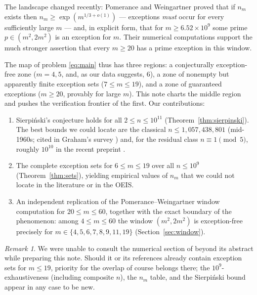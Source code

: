 \documentclass[11pt]{amsart}
\theoremstyle{remark}
\newtheorem{remark}[theorem]{Remark}
\theoremstyle{definition}
\begin{document}
The landscape changed recently: Pomerance and Weingartner
\cite{pomeranceweingartner2026} proved that if $n_m$ exists then
$n_m \ge \exp(m^{1/3+o(1)})$ --- exceptions \emph{must} occur for every
sufficiently large $m$ --- and, in explicit form, that for
$m \ge 6.52 \times 10^9$ some prime $p \in (m^2, 2m^2)$ is an exception
for $m$. Their numerical computations support the much stronger assertion
that every $m \ge 20$ has a prime exception in this window.

The map of problem \eqref{eq:main} thus has three regions: a
conjecturally exception-free zone ($m = 4, 5$, and, as our data suggests,
$6$), a zone of nonempty but apparently finite exception sets
($7 \le m \le 19$), and a zone of guaranteed exceptions ($m \ge 20$,
provably for large $m$). This note charts the middle region and pushes
the verification frontier of the first. Our contributions:

\begin{enumerate}
\item Sierpi\'nski's conjecture holds for all $2 \le n \le 10^{11}$
  (Theorem~\ref{thm:sierpinski}). The best bounds we could locate are the
  classical $n \le 1{,}057{,}438{,}801$ (mid-1960s; cited in Graham's
  survey \cite{graham2013}) and, for the residual class
  $n \equiv 1 \pmod 5$, roughly $10^{10}$ in the recent preprint
  \cite{ghermoul2025}.
\item The complete exception sets for $6 \le m \le 19$ over all
  $n \le 10^9$ (Theorem~\ref{thm:sets}), yielding empirical values of
  $n_m$ that we could not locate in the literature or in the OEIS.
\item An independent replication of the Pomerance--Weingartner window
  computation for $20 \le m \le 60$, together with the exact boundary of
  the phenomenon: among $4 \le m \le 60$ the window $(m^2, 2m^2)$ is
  exception-free precisely for $m \in \{4,5,6,7,8,9,11,19\}$
  (Section~\ref{sec:window}).
\end{enumerate}

\begin{remark}\label{rem:priority}
We were unable to consult the numerical section of
\cite{pomeranceweingartner2026} beyond its abstract while preparing this
note. Should it or its references already contain exception sets for
$m \le 19$, priority for the overlap of course belongs there; the
$10^9$-exhaustiveness (including composite $n$), the $n_m$ table, and the
Sierpi\'nski bound appear in any case to be new.
\end{remark}
\end{document}
